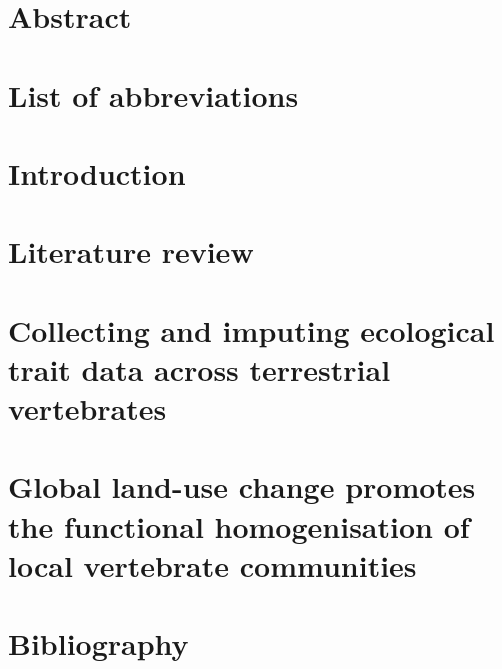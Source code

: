 \documentclass[11pt]{report}
\renewcommand{\baselinestretch}{1.5}
\begin{document}




\chapter*{Abstract}


\clearpage
\tableofcontents

{}

\clearpage
\listoftables
{}

\listoffigures



\chapter*{List of abbreviations}


\clearpage
\chapter{Introduction}
%

\chapter{Literature review}
%

\pagebreak
\chapter{Collecting and imputing ecological trait data across terrestrial vertebrates}


\chapter{Global land-use change promotes the functional homogenisation of local  vertebrate communities}


%


\clearpage
\chapter*{Bibliography}
\renewcommand{\baselinestretch}{1}
\printbibliography[heading=none]
\end{document}
